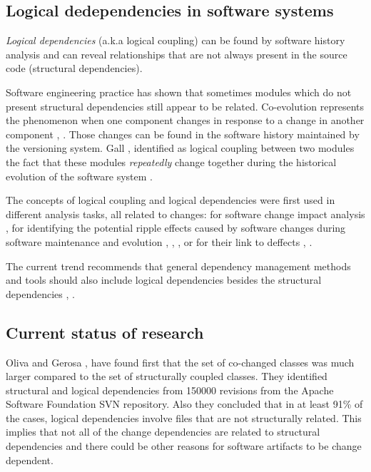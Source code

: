 \documentclass[12pt, a4paper, twoside]{report}
\begin{document}
\subsection{Logical dedependencies in software systems}
\textit{Logical dependencies} (a.k.a logical coupling) can be found by software history analysis and can reveal relationships that are not always present in the source code (structural dependencies).  

Software engineering practice has shown that sometimes modules which do not present structural dependencies still appear to be related. Co-evolution represents the phenomenon when one component changes in response to a change in another component \cite{Yu:2007:UCC:1231330.1231370}, \cite{5166450}. Those changes can be found in the software history maintained by the versioning system. Gall \cite{Gall:1998:DLC:850947.853338}, \cite{Gall:2003:CRH:942803.943741} identified as logical coupling between two modules the fact that these modules  \textit{repeatedly} change together during the historical evolution of the software system \cite{6606615}.

The concepts of logical coupling and logical dependencies were first used in different analysis tasks, all related to changes: for software change impact analysis \cite{1553643}, for identifying the potential ripple effects caused by software changes during software maintenance and evolution \cite{DBLP:conf/issre/OlivaG15}, \cite{Oliva:2011:ISL:2067853.2068086}, \cite{Poshyvanyk2009}, \cite{posh2010} or for their link to deffects \cite{wiese}, \cite{Zimmermann:2004:MVH:998675.999460}.

The current trend recommends that general dependency management methods and tools should also include logical dependencies besides the structural dependencies \cite{Oliva:2011:ISL:2067853.2068086}, \cite{DBLP:journals/jss/AjienkaC17}. 


\subsection{Current status of research}

Oliva and Gerosa \cite{Oliva:2011:ISL:2067853.2068086}, \cite{DBLP:conf/issre/OlivaG15} have found first that the set of co-changed classes was much larger compared to the set of structurally coupled classes. They identified structural and logical dependencies from 150000 revisions from the Apache Software Foundation SVN repository. Also they concluded  that in at least 91\% of the cases, logical dependencies involve files that are not structurally related. This implies that not all of the change dependencies are related to structural dependencies and there could be other reasons for software artifacts to be change dependent.
\end{document}
